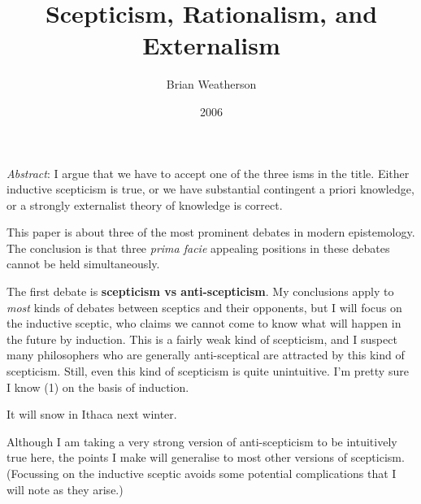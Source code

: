 \documentclass[
  11pt,
  letterpaper,
  DIV=11,
  numbers=noendperiod,
  twoside]{scrartcl}
\title{Scepticism, Rationalism, and Externalism}
\author{Brian Weatherson}
\date{2006}
\providecommand{\tightlist}{%
  \setlength{\itemsep}{0pt}\setlength{\parskip}{0pt}}
\renewenvironment{abstract}
 {\vspace{-1.25cm}
 \quotation\small\noindent\emph{Abstract}:}
 {\endquotation}
\renewenvironment{abstract}
 {\quotation\small\noindent\emph{Abstract}:}
 {\endquotation\vspace{-0.02cm}}
\begin{document}
\maketitle
\begin{abstract}
I argue that we have to accept one of the three isms in the title.
Either inductive scepticism is true, or we have substantial contingent a
priori knowledge, or a strongly externalist theory of knowledge is
correct.
\end{abstract}


This paper is about three of the most prominent debates in modern
epistemology. The conclusion is that three \emph{prima facie} appealing
positions in these debates cannot be held simultaneously.

The first debate is \textbf{scepticism vs anti-scepticism}. My
conclusions apply to \emph{most} kinds of debates between sceptics and
their opponents, but I will focus on the inductive sceptic, who claims
we cannot come to know what will happen in the future by induction. This
is a fairly weak kind of scepticism, and I suspect many philosophers who
are generally anti-sceptical are attracted by this kind of scepticism.
Still, even this kind of scepticism is quite unintuitive. I'm pretty
sure I know (1) on the basis of induction.

\begin{description}
\tightlist
\item[(1)]
It will snow in Ithaca next winter.
\end{description}

Although I am taking a very strong version of anti-scepticism to be
intuitively true here, the points I make will generalise to most other
versions of scepticism. (Focussing on the inductive sceptic avoids some
potential complications that I will note as they arise.)
\end{document}
